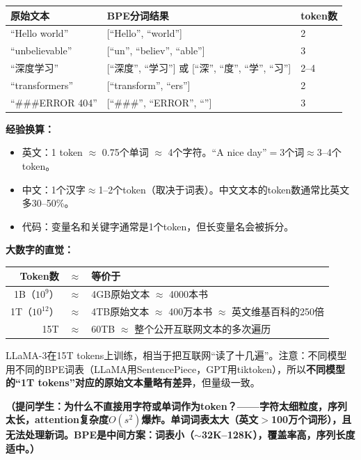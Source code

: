 \documentclass[11pt,a4paper]{article}
\begin{document}
\begin{center}
\renewcommand{\arraystretch}{1.3}
\begin{tabular}{lll}
\toprule
原始文本 & BPE分词结果 & token数 \\
\midrule
``Hello world'' & [``Hello'', ``\textvisiblespace world''] & 2 \\
``unbelievable'' & [``un'', ``believ'', ``able''] & 3 \\
``深度学习'' & [``深度'', ``学习''] 或 [``深'', ``度'', ``学'', ``习''] & 2--4 \\
``transformers'' & [``transform'', ``ers''] & 2 \\
``\#\#\#ERROR 404'' & [``\#\#\#'', ``ERROR'', ``\textvisiblespace 404''] & 3 \\
\bottomrule
\end{tabular}
\end{center}

\textbf{经验换算：}
\begin{itemize}[leftmargin=*]
\item 英文：1 token $\approx$ 0.75个单词 $\approx$ 4个字符。``A nice day''$=$3个词$\approx$3--4个token。
\item 中文：1个汉字$\approx$1--2个token（取决于词表）。中文文本的token数通常比英文多30--50\%。
\item 代码：变量名和关键字通常是1个token，但长变量名会被拆分。
\end{itemize}

\textbf{大数字的直觉：}

\begin{center}
\renewcommand{\arraystretch}{1.3}
\begin{tabular}{rcl}
\toprule
Token数 & $\approx$ & 等价于 \\
\midrule
1B（$10^9$） & $\approx$ & 4GB原始文本 $\approx$ 4000本书 \\
1T（$10^{12}$） & $\approx$ & 4TB原始文本 $\approx$ 400万本书 $\approx$ 英文维基百科的250倍 \\
15T & $\approx$ & 60TB $\approx$ 整个公开互联网文本的多次遍历 \\
\bottomrule
\end{tabular}
\end{center}

LLaMA-3在15T tokens上训练，相当于把互联网``读了十几遍''。注意：不同模型用不同的BPE词表（LLaMA用SentencePiece，GPT用tiktoken），所以\textbf{不同模型的``1T tokens''对应的原始文本量略有差异}，但量级一致。

\textbf{（提问学生：为什么不直接用字符或单词作为token？——字符太细粒度，序列太长，attention复杂度$O(s^2)$爆炸。单词词表太大（英文$>$100万个词形），且无法处理新词。BPE是中间方案：词表小（$\sim$32K--128K），覆盖率高，序列长度适中。）}
\end{document}
